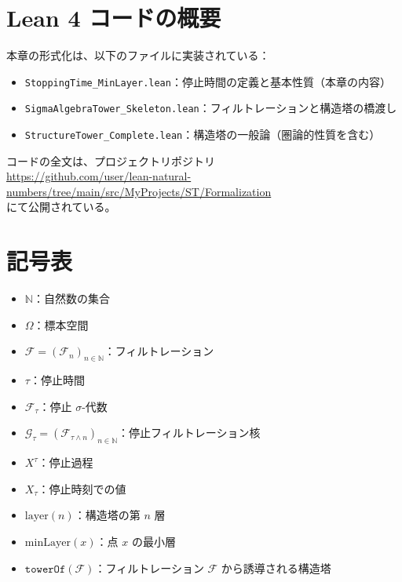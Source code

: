\documentclass[11pt,a4paper,ja=standard]{ltjsarticle}
\theoremstyle{definition}
\newcommand{\N}{\mathbb{N}}
\newcommand{\F}{\mathcal{F}}
\newcommand{\G}{\mathcal{G}}
\newcommand{\minLayer}{\mathrm{minLayer}}
\newcommand{\layer}{\mathrm{layer}}
\begin{document}
\appendix

\section{Lean 4 コードの概要}

本章の形式化は、以下のファイルに実装されている：

\begin{itemize}
\item \texttt{StoppingTime\_MinLayer.lean}：停止時間の定義と基本性質（本章の内容）
\item \texttt{SigmaAlgebraTower\_Skeleton.lean}：フィルトレーションと構造塔の橋渡し
\item \texttt{StructureTower\_Complete.lean}：構造塔の一般論（圏論的性質を含む）
\end{itemize}

コードの全文は、プロジェクトリポジトリ\\
\url{https://github.com/user/lean-natural-numbers/tree/main/src/MyProjects/ST/Formalization}\\
にて公開されている。

\section{記号表}

\begin{itemize}
\item $\N$：自然数の集合
\item $\Omega$：標本空間
\item $\F = (\F_n)_{n \in \N}$：フィルトレーション
\item $\tau$：停止時間
\item $\F_\tau$：停止 $\sigma$-代数
\item $\G_\tau = (\F_{\tau \wedge n})_{n \in \N}$：停止フィルトレーション核
\item $X^\tau$：停止過程
\item $X_\tau$：停止時刻での値
\item $\layer(n)$：構造塔の第 $n$ 層
\item $\minLayer(x)$：点 $x$ の最小層
\item $\mathtt{towerOf}(\F)$：フィルトレーション $\F$ から誘導される構造塔
\end{itemize}
\end{document}
